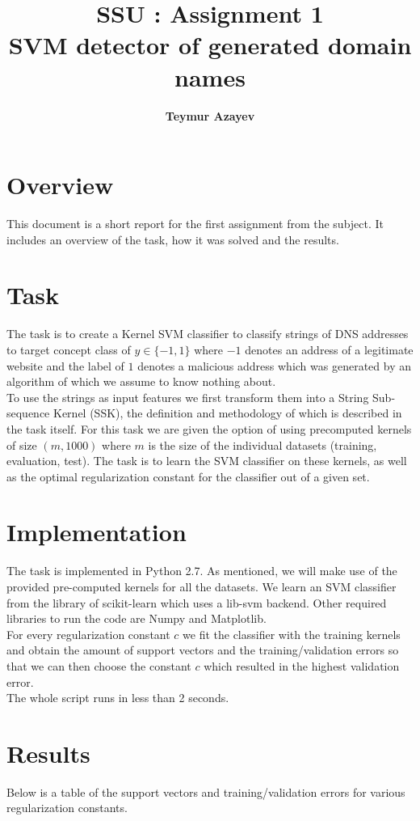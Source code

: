 \documentclass[11pt]{article}
\title{\textbf{SSU : Assignment 1} \\ \textbf{SVM detector of generated domain names}}
\author{\textbf{Teymur Azayev}}
\date{}
\begin{document}
\maketitle

\section{Overview}

This document is a short report for the first assignment from the subject. It includes an overview of the task,
how it was solved and the results.

\section{Task}
The task is to create a Kernel SVM classifier to classify strings of DNS addresses to target concept class of
$y \in \{-1,1\}$ where $ -1 $ denotes an address of a legitimate website and the label of $1$ denotes a malicious address which was generated by an algorithm of which we assume to know nothing about. 
\\
To use the strings as input features we first transform them into a String Sub-sequence Kernel (SSK), the definition and methodology of which is described in the task itself. For this task we are given the option of using 
precomputed kernels of size $(m,1000)$ where $m$ is the size of the individual datasets (training, evaluation, test). The task is to learn the SVM classifier on these kernels, as well as the optimal regularization constant
for the classifier out of a given set. 

\section{Implementation}
The task is implemented in Python 2.7. As mentioned, we will make use of the provided pre-computed kernels for all the datasets. We learn an SVM classifier from the library of scikit-learn which uses a lib-svm backend. Other required libraries to run the code are Numpy and Matplotlib. \\
For every regularization constant $c$ we fit the classifier with the training kernels and obtain the amount of support vectors and the training/validation errors so that we can then choose the constant $c$ which resulted in the highest validation error. \\
The whole script runs in less than 2 seconds.

\section{Results}
Below is a table of the support vectors and training/validation errors for various regularization constants.
\end{document}
